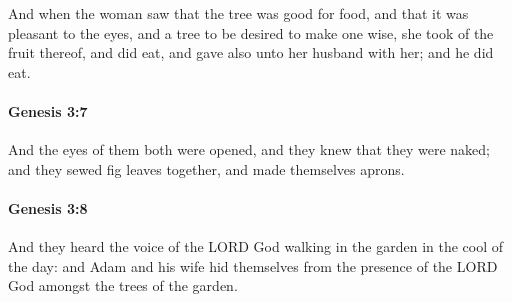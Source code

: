			And when the woman saw that the tree was good for food, and that it was pleasant to the eyes, and a tree to be desired to make one wise, she took of the fruit thereof, and did eat, and gave also unto her husband with her; and he did eat.


		\paragraph{Genesis 3:7} %
			\label{GENESIS-3-7}

			And the eyes of them both were opened, and they knew that they were naked; and they sewed fig leaves together, and made themselves aprons.


		\paragraph{Genesis 3:8} %
			\label{GENESIS-3-8}

			And they heard the voice of the LORD God walking in the garden in the cool of the day: and Adam and his wife hid themselves from the presence of the LORD God amongst the trees of the garden.


